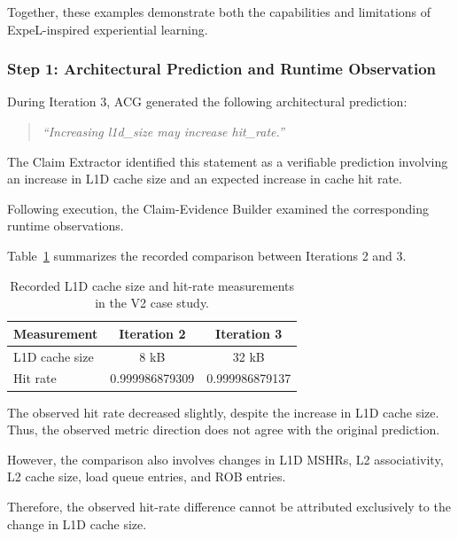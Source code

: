 Together, these examples demonstrate both
the capabilities and limitations of
ExpeL-inspired experiential learning.




\subsubsection{Step 1: Architectural Prediction and Runtime Observation}

During Iteration 3, ACG generated the following
architectural prediction:

\begin{quote}
\emph{``Increasing l1d\_size may increase hit\_rate.''}
\end{quote}

The Claim Extractor identified this statement
as a verifiable prediction involving an increase
in L1D cache size and an expected increase in
cache hit rate.

Following execution, the Claim-Evidence Builder
examined the corresponding runtime observations.

Table~\ref{tab:app_v2_l1d_evidence}
summarizes the recorded comparison between
Iterations 2 and 3.

\begin{table}[htbp]
\centering
\caption{Recorded L1D cache size and hit-rate
measurements in the V2 case study.}
\label{tab:app_v2_l1d_evidence}
\renewcommand{\arraystretch}{1.15}
\small
\begin{tabular}{lcc}
\toprule
\textbf{Measurement} &
\textbf{Iteration 2} &
\textbf{Iteration 3} \\
\midrule
L1D cache size & 8 kB & 32 kB \\
Hit rate & 0.999986879309 & 0.999986879137 \\
\bottomrule
\end{tabular}
\end{table}

The observed hit rate decreased slightly,
despite the increase in L1D cache size.
Thus, the observed metric direction does
not agree with the original prediction.

However, the comparison also involves
changes in L1D MSHRs, L2 associativity,
L2 cache size, load queue entries, and
ROB entries.

Therefore, the observed hit-rate difference
cannot be attributed exclusively to the
change in L1D cache size.

